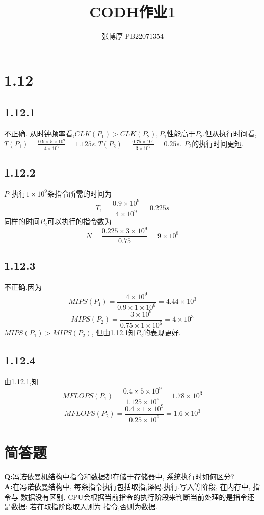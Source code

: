 \documentclass{article}
\title{CODH作业1}
\author{张博厚 PB22071354}
\date{}
\begin{document}
\maketitle
\section*{1.12}
\subsection*{1.12.1}
不正确. 从时钟频率看,$CLK(P_1)>CLK(P_2),P_1\mbox{性能高于}P_2.$但从执行时间看,
$T(P_1) = \frac{0.9\times 5\times10^9}{4\times10^9}=1.125s,T(P_2)
=\frac{0.75\times10^9}{3\times10^9}=0.25s$, $P_2$的执行时间更短.
\subsection*{1.12.2}
$P_1\mbox{执行}1\times10^9$条指令所需的时间为
$$T_1 = \dfrac{0.9\times10^9}{4\times 10^9}=0.225s$$
同样的时间$P_2$可以执行的指令数为
$$N = \dfrac{0.225\times3\times10^9}{0.75} = 9\times10^8$$
\subsection*{1.12.3}
不正确.因为
$$MIPS(P_1) = \dfrac{4\times10^9}{0.9\times1\times10^6}=4.44\times10^3$$
$$MIPS(P_2) = \dfrac{3\times10^9}{0.75\times1\times10^6} = 4\times10^3$$
$MIPS(P_1)>MIPS(P_2)$, 但由1.12.1知$P_2$的表现更好.

\subsection*{1.12.4}
由1.12.1,知
$$MFLOPS(P_1) = \dfrac{0.4\times5\times 10^9}{1.125\times10^6} = 1.78\times10^3$$
$$MFLOPS(P_2) = \dfrac{0.4\times1\times10^9}{0.25\times10^6} = 1.6\times10^3$$

\section*{简答题}
\textbf{Q:}冯诺依曼机结构中指令和数据都存储于存储器中, 系统执行时如何区分?\\
\textbf{A:}在冯诺依曼结构中, 每条指令执行包括取指,译码,执行,写入等阶段, 在内存中, 指令与
数据没有区别, CPU会根据当前指令的执行阶段来判断当前处理的是指令还是数据: 若在取指阶段取入则为
指令,否则为数据.
\end{document}
